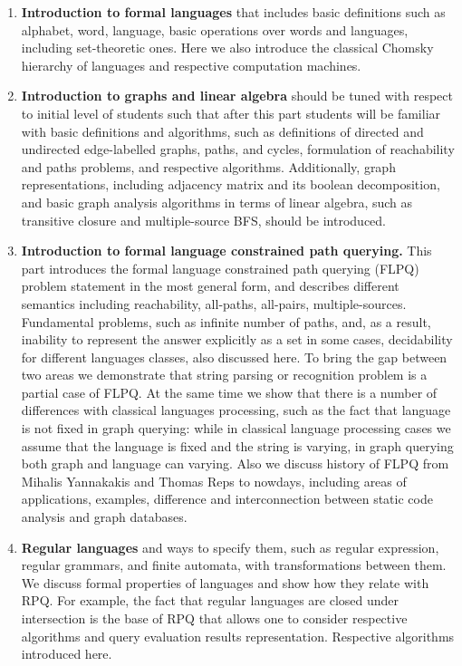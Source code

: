 \documentclass[sigconf]{acmart}
\begin{document}
\begin{enumerate}
  \item \label{fl_intro} \textbf{Introduction to formal languages} that includes basic definitions such as alphabet, word, language, basic operations over words and languages, including set-theoretic ones. 
  Here we also introduce the classical Chomsky hierarchy of languages and respective computation machines.
  
  \item \label{graphs_intro} \textbf{Introduction to graphs and linear algebra} should be tuned with respect to initial level of students such that after this part students will be familiar with basic definitions and algorithms, such as definitions of directed and undirected edge-labelled graphs, paths, and cycles, formulation of reachability and paths problems, and respective algorithms. 
  Additionally, graph representations, including adjacency matrix and its boolean decomposition, and basic graph analysis algorithms in terms of linear algebra, such as transitive closure and multiple-source BFS, should be introduced.
  
  \item \label{flpq_intro} \textbf{Introduction to formal language constrained path querying.} 
  This part introduces the formal language constrained path querying (FLPQ)~\cite{10.1137/S0097539798337716} problem statement in the most general form, and describes different semantics including reachability, all-paths, all-pairs, multiple-sources. 
  Fundamental problems, such as infinite number of paths, and, as a result, inability to represent the answer explicitly as a set in some cases, decidability for different languages classes, also discussed here. 
  To bring the gap between two areas we demonstrate that string parsing or recognition problem is a partial case of FLPQ. 
  At the same time we show that there is a number of differences with classical languages processing, such as the fact that language is not fixed in graph querying: while in classical language processing cases we assume that the language is fixed and the string is varying, in graph querying both graph and language can varying.
  Also we discuss history of FLPQ from Mihalis Yannakakis and Thomas Reps to nowdays, including areas of applications, examples, difference and interconnection between static code analysis and graph databases.

  \item \label{regular_languages_intro} \textbf{Regular languages} and ways to specify them, such as regular expression, regular grammars, and finite automata, with transformations between them. 
  We discuss formal properties of languages and show how they relate with RPQ.
  For example, the fact that regular languages are closed under intersection is the base of RPQ that allows one to consider respective algorithms and query evaluation results representation.
  Respective algorithms introduced here.
  

\end{enumerate}
\end{document}
